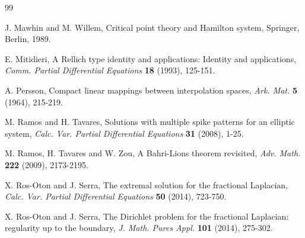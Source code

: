 \documentclass[10pt]{article}
\numberwithin{equation}{section}
\numberwithin{equation}{section}
\begin{document}
\begin{thebibliography}{99}



 J. Mawhin and M. Willem, Critical point theory and Hamilton system, Springer, Berlin, 1989.

 E. Mitidieri, A Rellich type identity and applications: Identity and applications, {\it Comm. Partial Differential Equations} {\bf 18} (1993), 125-151.


 A. Persson, Compact linear mappings between interpolation spaces, {\it Ark. Mat.} {\bf 5} (1964), 215-219.



 M. Ramos and H. Tavares,  Solutions with multiple spike patterns for an elliptic system, {\it Calc. Var. Partial Differential Equations} {\bf 31} (2008), 1-25.

 M. Ramos, H. Tavares and  W. Zou,  A Bahri-Lions theorem revisited, {\it Adv. Math.} {\bf 222} (2009), 2173-2195.

 X. Ros-Oton and J. Serra, The extremal solution for the fractional Laplacian, {\it Calc. Var. Partial Differential Equations} {\bf 50} (2014), 723-750.

 X. Ros-Oton and J. Serra, The Dirichlet problem for the fractional Laplacian: regularity up to the boundary, {\it J. Math. Pures Appl.} {\bf 101} (2014), 275-302.




\end{thebibliography}
\end{document}
